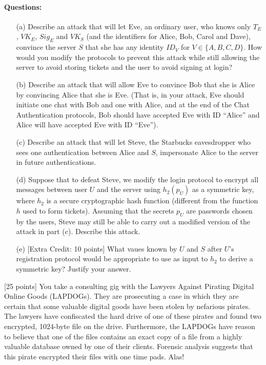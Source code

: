 \documentclass[11pt]{article}
\newcounter{qnum}
\newcommand{\question}[1]{\stepcounter{qnum}\bigskip\noindent{\bf \arabic{qnum}. #1.}}
\begin{document}
\paragraph{Questions:}
\begin{itemize}
\item[(a)] Describe an attack that will let Eve, an ordinary user, who knows only $T_E$,
  $VK_E$, $Sig_E$ and $VK_S$ (and the identifiers for Alice, Bob,
  Carol and Dave),  convince the server $S$ that she has
  any identity $ID_V$ for $V \in \{A,B,C,D\}$.  How would you modify
  the protocols to prevent this attack while still allowing the server
  to avoid storing tickets and the user to avoid signing at login?

\item[(b)] Describe an attack that will allow Eve to convince Bob that
  she is Alice by convincing Alice that she is Eve.  (That is, in your
  attack, Eve should initiate one chat with Bob and one with Alice,
  and at the end of the Chat Authentication protocols, Bob should have
  accepted Eve with ID ``Alice'' and Alice will have accepted Eve with
  ID ``Eve'').

\item[(c)] Describe an attack that will let Steve, the Starbucks
  eavesdropper who sees one authentication between Alice and $S$,
  impersonate Alice to the server in future authentications.

\item[(d)] Suppose that to defeat Steve, we modify the login protocol
  to encrypt all messages between user $U$ and the server using
  $h_2(p_U)$ as a symmetric key, where $h_2$ is a secure cryptographic hash
  function (different from the function $h$ used to form tickets).
  Assuming that the secrets $p_U$ are passwords chosen by the users,
  Steve may still be able to carry out a modified version of the
  attack in part (c).  Describe this attack.

\item[(e)] [Extra Credit: 10 points] What vaues known by $U$ and $S$
  after $U$'s registration protocol would be appropriate to use as
  input to $h_2$ to derive a symmetric key? Justify your answer.

\end{itemize}

\newpage
\newpage

\question{Cryptanalysis - The Two Time Pad} [25 points]
You take a consulting gig with the Lawyers Against Pirating Digital
Online Goods (LAPDOGs).  They are prosecuting a case in which they are
certain that some valuable digital goods have been stolen by nefarious
pirates.  The lawyers have confiscated the hard drive of one of these
pirates and found two encrypted, 1024-byte file on the drive.
Furthermore, the LAPDOGs have reason to believe that one of the files
contains an exact copy of a file from a highly valuable database owned
by one of their clients.  Forensic analysis suggests that this pirate
encrypted their files with one time pads.  Alas!
\end{document}
